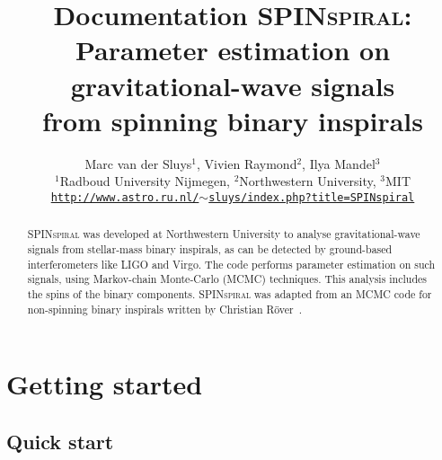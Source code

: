 \usepackage[english]{babel}


\title{Documentation \textsc{SPINspiral}:\\
  Parameter estimation on gravitational-wave signals\\
  from spinning binary inspirals}
\author{Marc van der Sluys$^1$, Vivien Raymond$^2$, Ilya Mandel$^3$ \\
  \small$^1$Radboud University Nijmegen, $^2$Northwestern University, $^3$MIT \\
  \small\texttt{\href{http://www.astro.ru.nl/~sluys/index.php?title=SPINspiral}{http://www.astro.ru.nl/$\sim$sluys/index.php?title=SPINspiral}}}



\usepackage[pdftex=true]{hyperref}  
\hypersetup{
  pdftitle = Documentation SPINspiral: Parameter estimation on gravitational-wave signals from spinning binary inspirals,
  pdfauthor = Marc van der Sluys,
  pdfsubject = Documentation MCMC code SPINspiral,
  pdfkeywords = SPINspiral MCMC Documentation,
  colorlinks = true,
  linkcolor = blue,
  anchorcolor = blue,
  citecolor = blue,
  filecolor = blue,
  urlcolor = blue,
  pdfpagemode=UseThumbs,
}
 


\maketitle




\begin{abstract}
  \textsc{SPINspiral} was developed at Northwestern University to analyse gravitational-wave signals from
  stellar-mass binary inspirals, as can be detected by ground-based interferometers like LIGO and Virgo.  
  The code performs parameter estimation on such signals, using Markov-chain Monte-Carlo (MCMC) techniques.
  This analysis includes the spins of the binary components.  \textsc{SPINspiral} was adapted from an MCMC 
  code for non-spinning binary inspirals written by Christian R\"over~\cite{RoeverThesis2007}.
\end{abstract}

\tableofcontents

\pagebreak


\section{Getting started}

\subsection{Quick start}

